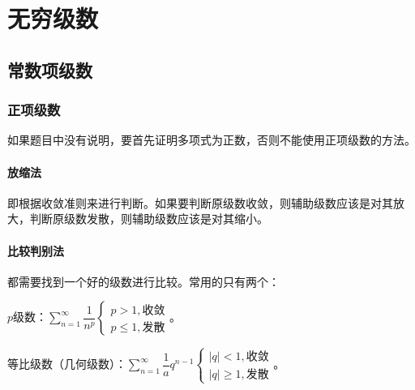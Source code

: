 \setcounter{tocdepth}{4}
\setcounter{secnumdepth}{4}
\renewcommand{\baselinestretch}{1.5}
\chapter{无穷级数}
\section{常数项级数}

\subsection{正项级数}

如果题目中没有说明，要首先证明多项式为正数，否则不能使用正项级数的方法。

\subsubsection{放缩法}

即根据收敛准则来进行判断。如果要判断原级数收敛，则辅助级数应该是对其放大，判断原级数发散，则辅助级数应该是对其缩小。

\subsubsection{比较判别法}

都需要找到一个好的级数进行比较。常用的只有两个：

$p$级数：$\sum\limits_{n=1}^\infty\dfrac{1}{n^p}\left\{\begin{array}{l}
    p>1, \text{收敛} \\
    p\leqslant1, \text{发散}
\end{array}\right.$。

等比级数（几何级数）：$\sum\limits_{n=1}^\infty\dfrac{1}aq^{n-1}\left\{\begin{array}{l}
    \vert q\vert<1, \text{收敛} \\
    \vert q\vert\geqslant 1, \text{发散}
\end{array}\right.$。

